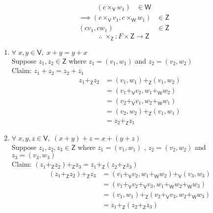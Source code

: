 \documentclass[letterpaper,12pt]{article}
\newcommand{\?}{\stackrel{?}{=}}
\begin{document}
\begin{spacing}{1.5}
\begin{enumerate}
\begin{align}
\left(c\times_\mathsf{V}w_1\right) &\in \mathsf{W}
\end{align}
\begin{align}
\implies \left(c\times_\mathsf{V} v_1, c\times_\mathsf{W}w_1\right)
&\in \mathsf{Z}\\
\left(cv_1, cw_1\right) &\in \mathsf{Z}
\end{align}
\begin{equation}
\therefore\; \times_\mathsf{Z} \colon F \times \mathsf{Z} \to \mathsf{Z}
\end{equation}
\newpage{}
\begin{enumerate}[(VS 1)]
\item $\forall\; x,y \in \mathsf{V}, \; x+y = y + x$
\\
Suppose $z_1,z_2 \in \mathsf{Z} $ where $z_1 = \left(v_1,w_1\right)$
and $z_2 = \left(v_2,w_2\right)$\\
Claim: $z_1 + z_2 = z_2 + z_1$
\begin{align}
z_1 +_\mathsf{Z} z_2 &= \left(v_1,w_1\right) +_\mathsf{Z} \left(v_1,w_2\right)\\
&= \left(v_1 +_\mathsf{V} v_2, w_1 +_\mathsf{W} w_2 \right)\\
&= \left(v_2 +_\mathsf{V} v_1, w_2 +_\mathsf{W} w_1 \right)\\
&= \left(v_2,w_2\right) +_\mathsf{Z} \left(v_1,w_1\right)\\
&= z_2 +_\mathsf{Z} z_1
\end{align}

\item $\forall\; x,y,z \in \mathsf{V}, \; \left(x + y\right) + z = x +
  \left(y + z\right)$\\
Suppose $z_1,z_2,z_3 \in \mathsf{Z} $ where $z_1 = \left(v_1,w_1\right)$
, $z_2 = \left(v_2,w_2\right)$ and $z_3 = \left(v_3,w_3\right)$   \\
Claim: $\left(z_1 +_\mathsf{Z} z_2\right) +_\mathsf{Z} z_3 =z_1
+_\mathsf{Z} \left(z_2 +_\mathsf{Z} z_3\right)$
\begin{align}
\left(z_1 +_\mathsf{Z} z_2\right) +_\mathsf{Z} z_3 & = \left(v_1
  +_\mathsf{V} v_2, w_1 +_\mathsf{W} w_2\right) +_\mathsf{V}
\left(v_3,w_3\right)\\
&= \left(v_1 +_\mathsf{V} v_2 +_\mathsf{V} v_3, w_1 +_\mathsf{W} w_2 +_\mathsf{W} w_3\right)\\
&= \left(v_1,w_1\right) +_\mathsf{Z}
\left(v_2+_\mathsf{V}v_3,w_2+_\mathsf{W}w_3\right)\\
&= z_1 +_\mathsf{Z} \left(z_2 +_\mathsf{Z} z_3\right)
\end{align}


\end{enumerate}
\end{enumerate}
\end{spacing}
\end{document}
